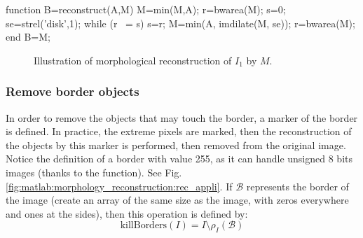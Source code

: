 \begin{matlab}
function B=reconstruct(A,M)
M=min(M,A);
r=bwarea(M);
s=0;
se=strel('disk',1);
while (r ~= s)
    s=r;
    M=min(A, imdilate(M, se));
    r=bwarea(M);
end
B=M;
\end{matlab}
 
\begin{figure}[htbp]
\centering
{}\hspace{.5cm}
\hspace{.5cm}
\caption{Illustration of morphological reconstruction of $I_1$ by $M$.}
\label{fig:matlab:morphology_reconstruction:reconstruction}
\end{figure}
 
\subsubsection{Remove border objects}
In order to remove the objects that may touch the border, a marker of the border is defined. In practice, the extreme pixels are marked, then the reconstruction of the objects by this marker is performed, then removed from the original image. Notice the definition of a border with value 255, as it can handle unsigned 8 bits images (thanks to the  function). See Fig.\ref{fig:matlab:morphology_reconstruction:rec_appli}.
If $\mathcal{B}$ represents the border of the image (create an array of the same size as the image, with zeros everywhere and ones at the sides), then this operation is defined by:
\[ \textrm{killBorders}(I) = I\setminus \rho_I(\mathcal{B})\]

